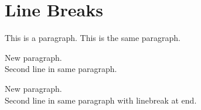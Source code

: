 
\def\mytitle{Line Break Test}


\part{Line Breaks}
\label{linebreaks}

This is a paragraph.
This is the same paragraph.

New paragraph.\\
Second line in same paragraph.

New paragraph.\\
Second line in same paragraph with linebreak at end. 




